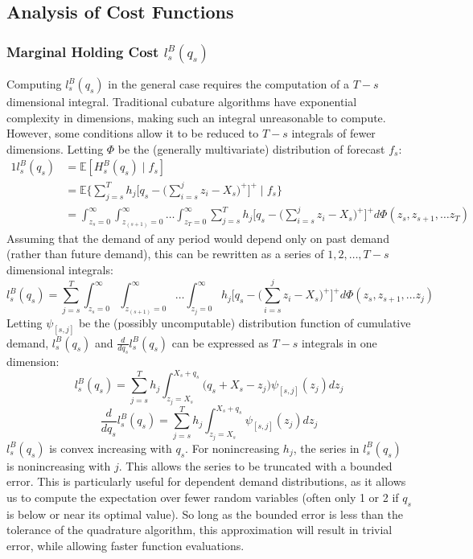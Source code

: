 \documentclass[12pt]{article}
\newcommand{\EX}{\mathbb{E}}
\begin{document}
\subsection{Analysis of Cost Functions}

\subsubsection*{Marginal Holding Cost $l_s^B(q_s)$}

Computing $l_s^B(q_s)$ in the general case requires the computation of a $T - s$ dimensional integral. Traditional cubature algorithms have exponential complexity in dimensions, making such an integral unreasonable to compute. However, some conditions allow it to be reduced to $T-s$ integrals of fewer dimensions. Letting $\Phi$ be the (generally multivariate) distribution of forecast $f_s$: 
\begin{alignat*}{1}
	l_s^B(q_s) &= \EX [H_s^B(q_s) \; | \; f_s] \\
        &= \EX \bigg\{\sum_{j=s}^T h_j\bigg[q_s - \bigg(\sum_{i=s}^j z_i - X_s\bigg)^+\bigg]^+  \; | \; f_s \bigg\} \\
		&= \int_{z_s=0}^{\infty} \int_{z_{(s+1)}=0}^{\infty}\dots \int_{z_T=0}^{\infty}\sum_{j=s}^T h_j\bigg[q_s - \bigg(\sum_{i=s}^j z_i - X_s\bigg)^+\bigg]^+ d\Phi(z_s, z_{s+1}, \dots z_T)
\end{alignat*}
Assuming that the demand of any period would depend only on past demand (rather than future demand), this can be rewritten as a series of $1, 2, \dots, T - s$ dimensional integrals: 
\begin{equation*}
	  l_s^B(q_s) = \sum_{j=s}^T \int_{z_s=0}^{\infty} \int_{z_{(s+1)}=0}^{\infty}\dots \int_{z_j=0}^{\infty} h_j\bigg[q_s - \bigg(\sum_{i=s}^j z_i - X_s\bigg)^+\bigg]^+ d\Phi(z_s, z_{s+1}, \dots z_j)
\end{equation*}
Letting $\psi_{[s,j]}$ be the (possibly uncomputable) distribution function of cumulative demand, $l_s^B(q_s)$ and $\frac{d}{d q_s} l_s^B(q_s)$ can be expressed as $T - s$ integrals in one dimension:
\begin{equation}
	l_s^B(q_s) = \sum_{j=s}^T  h_j \int_{z_j=X_s}^{X_s + q_s}\bigg(q_s + X_s - z_j \bigg) \psi_{[s,j]} (z_j) dz_j
\end{equation}
\begin{equation}
	\frac{d}{d q_s} l_s^B(q_s) =  \sum_{j=s}^T h_j \int_{z_j=X_s}^{X_s + q_s}  \psi_{[s,j]}(z_j) dz_j
\end{equation}
$l_s^B(q_s)$ is convex increasing with $q_s$. For nonincreasing $h_j$, the series in $l_s^B(q_s)$ is nonincreasing with $j$. This allows the series to be truncated with a bounded error. This is particularly useful for dependent demand distributions, as it allows us to compute the expectation over fewer random variables (often only 1 or 2 if $q_s$ is below or near its optimal value). So long as the bounded error is less than the tolerance of the quadrature algorithm, this approximation will result in trivial error, while allowing faster function evaluations.\\
\end{document}
